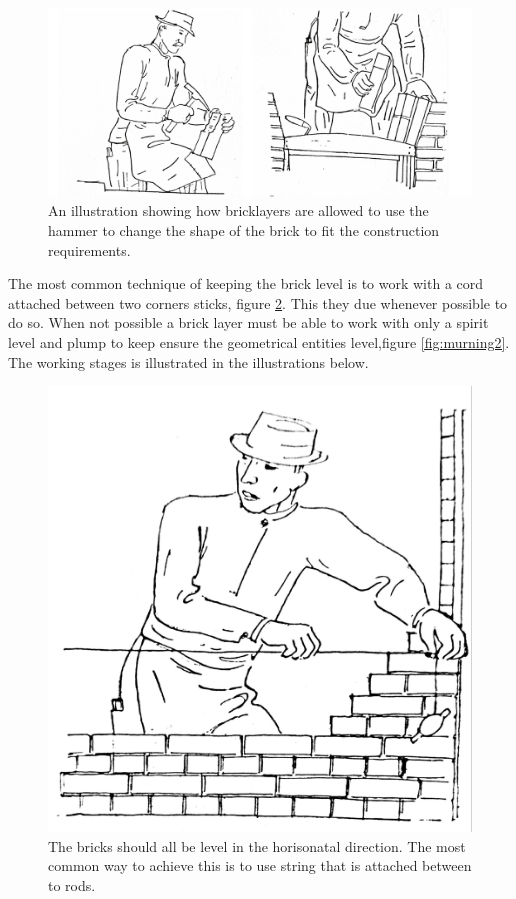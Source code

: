 \begin{figure}[H]
\centering
\includegraphics[width=0.80\linewidth ]{figure/Introduction/vaultingbrick2.pdf}
\caption{An illustration showing how bricklayers are allowed to use the hammer to change the shape of the brick to fit the construction requirements.\cite{ref:murning}}
\label{fig:murning3}
\end{figure}


The most common technique of keeping the brick level is to work with a cord attached between two corners sticks, figure \ref{fig:murning}. This they due whenever possible  to do so. When not possible a brick layer must be able to work with only a spirit level and plump to keep ensure the geometrical entities level,figure \ref{fig:murning2}. The working stages is illustrated in the illustrations below.  

\begin{figure}[H]
\centering
\includegraphics[width=0.40\linewidth ]{figure/Introduction/bricklay4.pdf}
\caption{The bricks should all be level in the horisonatal direction. The most common way to achieve this is to use string that is attached between to rods.\cite{ref:murning}}
\label{fig:murning}
\end{figure}

